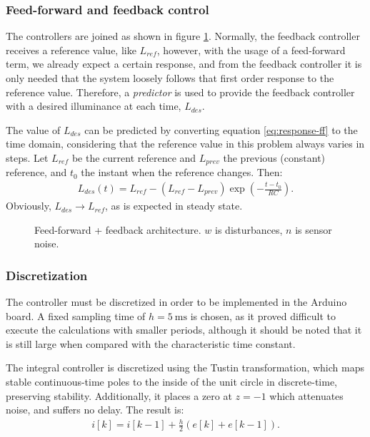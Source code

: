 \documentclass[english,fira]{ist-report}
\begin{document}
\subsubsection{Feed-forward and feedback control}

The controllers are joined as shown in figure \ref{fig:ff+fb}. 
Normally, the feedback controller receives a reference value, like $L_{ref}$, however, with the usage of a feed-forward term, we already expect a certain response, and from the feedback controller it is only needed that the system loosely follows that first order response to the reference value.
Therefore, a \emph{predictor} is used to provide the feedback controller with a desired illuminance at each time, $L_{des}$. 

The value of $L_{des}$ can be predicted by converting equation \ref{eq:response-ff} to the time domain, considering that the reference value in this problem always varies in steps. 
Let $L_{ref}$ be the current reference and $L_{prev}$ the previous (constant) reference, and $t_0$ the instant when the reference changes. Then:
\begin{align}
    L_{des}(t) = L_{ref} - \left( L_{ref}-L_{prev} \right)\exp\left(-\frac{t-t_0}{RC}\right).
    \label{eq:predictor}
\end{align}
Obviously, $L_{des} \rightarrow L_{ref}$, as is expected in steady state.

\begin{figure}[ht]
    \centering
    \resizebox{\linewidth}{!}{}
    \caption{Feed-forward + feedback architecture. $w$ is disturbances, $n$ is sensor noise.}
    \label{fig:ff+fb}
\end{figure}

\subsubsection{Discretization}

The controller must be discretized in order to be implemented in the Arduino board. A fixed sampling time of $h=\SI{5}{\milli\second}$ is chosen, as it proved difficult to execute the calculations with smaller periods, although it should be noted that it is still large when compared with the characteristic time constant.

The integral controller is discretized using the Tustin transformation, which maps stable continuous-time poles to the inside of the unit circle in discrete-time, preserving stability. Additionally, it places a zero at $z=-1$ which attenuates noise, and suffers no delay. 
The result is:
\begin{align}
    i[k] = i[k-1] + \frac{h}{2}\left( e[k] + e[k-1] \right).
    \label{eq:integral-tustin}
\end{align}
\end{document}
